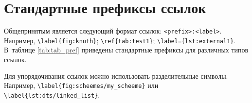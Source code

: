 \appendix
\renewcommand*{\printchaptername}{\chapnamefont \appendixname}
\setlength{\midchapskip}{6pt}
\renewcommand*{\afterchapternum}{\par\nobreak\vskip \midchapskip}
\renewcommand\thechapter{\Asbuk{chapter}}


\chapter{Стандартные префиксы ссылок}\label{app:A}

Общепринятым является следующий формат ссылок: \linebreak
\texttt{<prefix>:<label>}.
Например, \verb+\label{fig:knuth}+; \verb+\ref{tab:test1}+;
\verb+\label={lst:external1}+.
В~таблице \cref{tab:tab_pref} приведены стандартные префиксы для различных
типов ссылок.

\begin{table}[htbp]
    \captionsetup{justification=centering}
\end{table}

Для упорядочивания ссылок можно использовать разделительные символы.
Например, \verb+\label{fig:scheemes/my_scheeme}+ или \verb+\label{lst:dts/linked_list}+.
